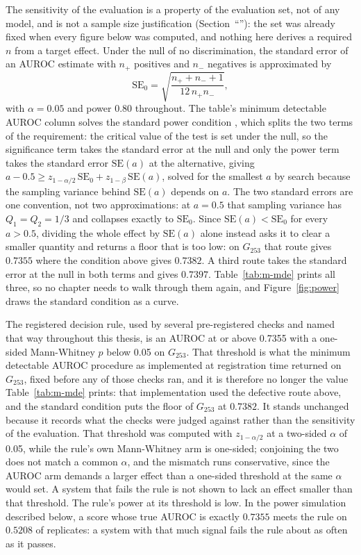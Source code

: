 The sensitivity of the evaluation is a property of the evaluation set, not of any model, and
is not a sample size justification (Section~``''): the set was already
fixed when every figure below was computed, and nothing here derives a required $n$ from a
target effect. Under the null of no discrimination, the standard error of an AUROC
estimate with $n_+$ positives and $n_-$ negatives is approximated by
\[
\mathrm{SE}_0 = \sqrt{\frac{n_+ + n_- + 1}{12\, n_+ n_-}} ,
\]
with $\alpha = 0.05$ and power $0.80$ throughout. The table's minimum detectable AUROC column solves the
standard power condition \citep{hanley1982meaning}, which splits the two terms of the requirement: the critical
value of the test is set under the null, so the significance term takes the standard error at the null and
only the power term takes the standard error $\mathrm{SE}(a)$ at the alternative, giving
$a - 0.5 \geq z_{1-\alpha/2}\, \mathrm{SE}_0 + z_{1-\beta}\, \mathrm{SE}(a)$, solved for the smallest
$a$ by search because the sampling variance behind $\mathrm{SE}(a)$ \citep{hanley1982meaning} depends on
$a$. The two standard errors are one convention, not two approximations: at $a = 0.5$ that sampling variance
has $Q_1 = Q_2 = 1/3$ and collapses exactly to $\mathrm{SE}_0$. Since $\mathrm{SE}(a) < \mathrm{SE}_0$ for
every $a > 0.5$, dividing the whole effect by $\mathrm{SE}(a)$ alone instead asks it to clear a smaller
quantity and returns a floor that is too low: on $G_{253}$ that route gives $0.7355$ where the condition
above gives $0.7382$. A third route takes the standard error at the null in both terms and gives $0.7397$.
Table~\ref{tab:m-mde} prints all three, so no chapter needs to walk through them again, and
Figure~\ref{fig:power} draws the standard condition as a curve.

The registered decision rule, used by several pre-registered checks and named that way throughout
this thesis, is an AUROC at or above 0.7355 with a one-sided Mann-Whitney $p$ below 0.05 on
$G_{253}$. That threshold is what the minimum detectable AUROC procedure as implemented at registration
time returned on $G_{253}$, fixed before any of those checks ran, and it is therefore no longer the value
Table~\ref{tab:m-mde} prints: that implementation used the defective route above, and the standard
condition puts the floor of $G_{253}$ at $0.7382$. It stands unchanged because it records what the checks
were judged against rather than the sensitivity of the evaluation. That threshold was computed with $z_{1-\alpha/2}$ at a
two-sided $\alpha$ of 0.05, while the rule's own Mann-Whitney arm is one-sided; conjoining the two
does not match a common $\alpha$, and the mismatch runs conservative, since the AUROC arm demands a
larger effect than a one-sided threshold at the same $\alpha$ would set. A system that fails the rule is not shown to lack an effect
smaller than that threshold. The rule's power at its threshold is low. In the power simulation
described below, a score whose true AUROC is exactly $0.7355$ meets the rule on $0.5208$ of
replicates: a system with that much signal fails the rule about as often as it passes.

